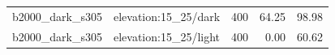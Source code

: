 \begin{longtable}{l>{\raggedright\arraybackslash}p{.42\linewidth}rrr}
b2000\_\allowbreak{}dark\_\allowbreak{}s305 & %
elevation:15\_\allowbreak{}25/dark & %
400 & %
64.25 & %
98.98 \\ %

b2000\_\allowbreak{}dark\_\allowbreak{}s305 & %
elevation:15\_\allowbreak{}25/light & %
400 & %
0.00 & %
60.62 \\ %


\end{longtable}
